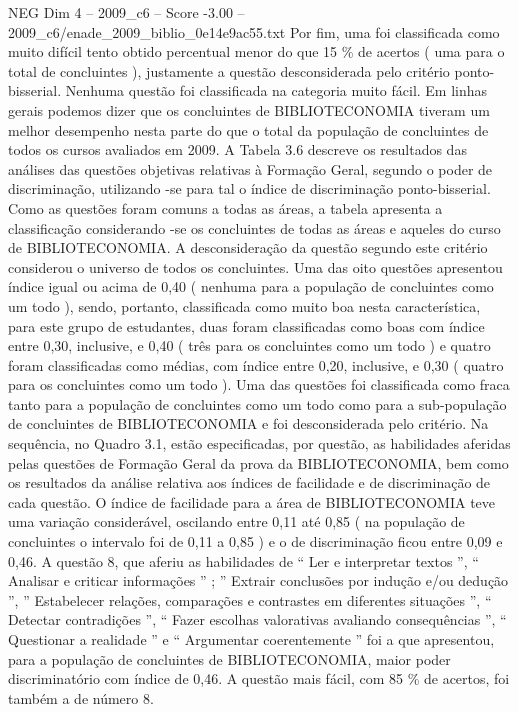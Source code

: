 \begin{textsample}{NEG Dim 4 – 2009\_c6 – Score -3.00 – 2009\_c6/enade\_2009\_biblio\_0e14e9ac55.txt}
Por fim, uma foi classificada como muito difícil tento obtido percentual menor do que 15 \% de acertos ( uma para o total de concluintes ), justamente a questão desconsiderada pelo critério ponto-bisserial.
Nenhuma questão foi classificada na categoria muito fácil.
Em linhas gerais podemos dizer que os concluintes de BIBLIOTECONOMIA tiveram um melhor desempenho nesta parte do que o total da população de concluintes de todos os cursos avaliados em 2009.
A Tabela 3.6 descreve os resultados das análises das questões objetivas relativas à Formação Geral, segundo o poder de discriminação, utilizando -se para tal o índice de discriminação ponto-bisserial.
Como as questões foram comuns a todas as áreas, a tabela apresenta a classificação considerando -se os concluintes de todas as áreas e aqueles do curso de BIBLIOTECONOMIA.
A desconsideração da questão segundo este critério considerou o universo de todos os concluintes.
Uma das oito questões apresentou índice igual ou acima de 0,40 ( nenhuma para a população de concluintes como um todo ), sendo, portanto, classificada como muito boa nesta característica, para este grupo de estudantes, duas foram classificadas como boas com índice entre 0,30, inclusive, e 0,40 ( três para os concluintes como um todo ) e quatro foram classificadas como médias, com índice entre 0,20, inclusive, e 0,30 ( quatro para os concluintes como um todo ).
Uma das questões foi classificada como fraca tanto para a população de concluintes como um todo como para a sub-população de concluintes de BIBLIOTECONOMIA e foi desconsiderada pelo critério.
Na sequência, no Quadro 3.1, estão especificadas, por questão, as habilidades aferidas pelas questões de Formação Geral da prova da BIBLIOTECONOMIA, bem como os resultados da análise relativa aos índices de facilidade e de discriminação de cada questão.
O índice de facilidade para a área de BIBLIOTECONOMIA teve uma variação considerável, oscilando entre 0,11 até 0,85 ( na população de concluintes o intervalo foi de 0,11 a 0,85 ) e o de discriminação ficou entre 0,09 e 0,46.
A questão 8, que aferiu as habilidades de “ Ler e interpretar textos ”, “ Analisar e criticar informações ” ; ” Extrair conclusões por indução e/ou dedução ”, ” Estabelecer relações, comparações e contrastes em diferentes situações ”, “ Detectar contradições ”, “ Fazer escolhas valorativas avaliando consequências ”, “ Questionar a realidade ” e “ Argumentar coerentemente ” foi a que apresentou, para a população de concluintes de BIBLIOTECONOMIA, maior poder discriminatório com índice de 0,46.
A questão mais fácil, com 85 \% de acertos, foi também a de número 8.

\end{textsample}
